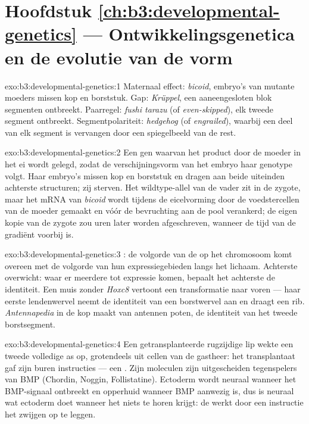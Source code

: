\section*{Hoofdstuk \ref{ch:b3:developmental-genetics} --- Ontwikkelingsgenetica en de evolutie van de vorm}

\begin{solution}{exo:b3:developmental-genetics:1}
Maternaal effect: \emph{bicoid}, embryo's van mutante moeders missen
kop en borststuk. Gap: \emph{Krüppel}, een aaneengesloten blok
segmenten ontbreekt. Paarregel: \emph{fushi tarazu} (of
\emph{even-skipped}), elk tweede segment ontbreekt. Segmentpolariteit:
\emph{hedgehog} (of \emph{engrailed}), waarbij een deel van elk segment
is vervangen door een spiegelbeeld van de rest.
\end{solution}

\begin{solution}{exo:b3:developmental-genetics:2}
Een gen waarvan het product door de moeder in het ei wordt gelegd,
zodat de verschijningsvorm van het embryo haar genotype volgt. Haar
embryo's missen kop en borststuk en dragen aan beide uiteinden
achterste structuren; zij sterven. Het wildtype-allel van de vader zit
in de zygote, maar het mRNA van \emph{bicoid} wordt tijdens de
eicelvorming door de voedstercellen van de moeder gemaakt en vóór de
bevruchting aan de pool verankerd; de eigen kopie van de zygote zou uren
later worden afgeschreven, wanneer de tijd van de gradiënt voorbij is.
\end{solution}

\begin{solution}{exo:b3:developmental-genetics:3}
: de volgorde van de  op het chromosoom komt
overeen met de volgorde van hun expressiegebieden langs het lichaam.
Achterste overwicht: waar er meerdere tot expressie komen, bepaalt het
achterste de identiteit. Een muis zonder \emph{Hoxc8} vertoont een
transformatie naar voren --- haar eerste lendenwervel neemt de
identiteit van een borstwervel aan en draagt een rib.
\emph{Antennapedia} in de kop maakt van antennen poten, de identiteit
van het tweede borstsegment.
\end{solution}

\begin{solution}{exo:b3:developmental-genetics:4}
Een getransplanteerde rugzijdige lip wekte een tweede volledige as op,
grotendeels uit cellen van de gastheer: het transplantaat gaf zijn
buren instructies --- een . Zijn moleculen zijn
uitgescheiden tegenspelers van BMP (Chordin, Noggin, Follistatine).
Ectoderm wordt neuraal wanneer het BMP-signaal ontbreekt en opperhuid
wanneer BMP aanwezig is, dus is neuraal wat ectoderm doet wanneer het
niets te horen krijgt: de  werkt door een instructie het
zwijgen op te leggen.
\end{solution}

